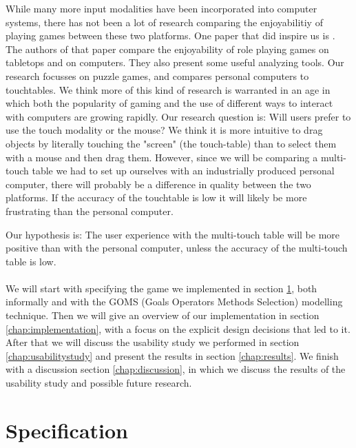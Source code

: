 \documentclass[a4paper,10pt]{report}
\begin{document}
While many more input modalities have been incorporated into computer systems, there has not been a lot of research comparing the enjoyabilitiy of playing games between these two platforms. 
One paper that did inspire us is \cite{Tychsen2007}.
The authors of that paper compare the enjoyability of role playing games on tabletops and on computers.
They also present some useful analyzing tools. 
Our research focusses on puzzle games, and compares personal computers to touchtables.
We think more of this kind of research is warranted in an age in which both the popularity of gaming and the use of different ways to interact with computers are growing rapidly.
Our research question is: Will users prefer to use the touch modality or the mouse? 
We think it is more intuitive to drag objects by literally touching the "screen" (the touch-table) than to select them with a mouse and then drag them.
However, since we will be comparing a multi-touch table we had to set up ourselves with an industrially produced personal computer, there will probably be a difference in quality between the two platforms. If the accuracy of the touchtable is low it will likely be more frustrating than the personal computer.

Our hypothesis is: The user experience with the multi-touch table will be more positive than with the personal computer, unless the accuracy of the multi-touch table is low. \\\\
We will start with specifying the game we implemented in section \ref{chap:specification}, both informally and with the  GOMS (Goals Operators Methods Selection) modelling technique. 
Then we will give an overview of our implementation in section \ref{chap:implementation}, with a focus on the explicit design decisions that led to it.
After that we will discuss the usability study we performed in section \ref{chap:usabilitystudy} and present the results in section \ref{chap:results}. 
We finish with a discussion section \ref{chap:discussion}, in which we discuss the results of the usability study and possible future research. 

\chapter{Specification}
\label{chap:specification}
\end{document}
